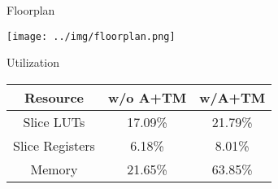 \begin{block}{Floorplan}

\begin{minipage}{0.45\linewidth}
\texttt{[image: ../img/floorplan.png]}
\end{minipage}
\begin{minipage}{0.45\linewidth}
\centering
\alert{Utilization} \\[0.5\baselineskip]
\footnotesize
\begin{tabular}{ | c | c | c |  } \hline
    Resource        & w/o A+TM & w/A+TM  \\ \hline
    Slice LUTs      & 17.09\%   &  21.79\%   \\  \hline
    Slice Registers & 6.18\%    &  8.01\%    \\  \hline
    Memory          & 21.65\%   &  63.85\%   \\  \hline
\end{tabular}
\end{minipage}

\end{block}
